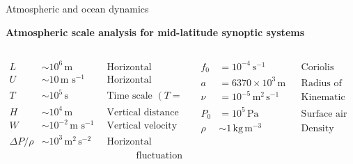 \documentclass[aspectratio=169,xcolor=dvipsnames]{beamer}
\begin{document}
\begin{frame}[t]{Atmospheric and ocean dynamics}

\vspace{-1.0em}

\begin{center}
\textbf{{\large
Atmospheric scale analysis for mid-latitude synoptic systems
}}
\end{center}

\footnotesize
\centering

\vspace{1.5em}

\begin{columns}
    \begin{column}{0.5\textwidth}
        \begin{align*}
            L &\sim 10^6\,\text{m} && \text{Horizontal distance scale} \\
            U &\sim 10\,\text{m s}^{-1} && \text{Horizontal velocity scale} \\
            T &\sim 10^5\,\text{s} && \text{Time scale } (T = L/U) \\
            H &\sim 10^4\,\text{m} && \text{Vertical distance scale} \\
            W &\sim 10^{-2}\,\text{m s}^{-1} && \text{Vertical velocity scale} \\
            \Delta P/\rho &\sim 10^3\,\text{m}^2\,\text{s}^{-2} && \text{Horizontal pressure} \\
            & && \quad\quad\quad \text{fluctuation scale}
        \end{align*}
    \end{column}
    \begin{column}{0.4\textwidth}
        \begin{align*}
            f_0 &= 10^{-4}\,\text{s}^{-1} && \text{Coriolis parameter} \\
            a &= 6370 \times 10^3\,\text{m} && \text{Radius of the Earth} \\
            \nu &= 10^{-5}\,\text{m}^2\,\text{s}^{-1} && \text{Kinematic viscosity} \\
            P_0 &= 10^{5}\,\text{Pa} && \text{Surface air pressure} \\
            \rho &\sim 1\,\text{kg}\,\text{m}^{-3} && \text{Density}
        \end{align*}
    \end{column}
\end{columns}

\end{frame}
\end{document}
